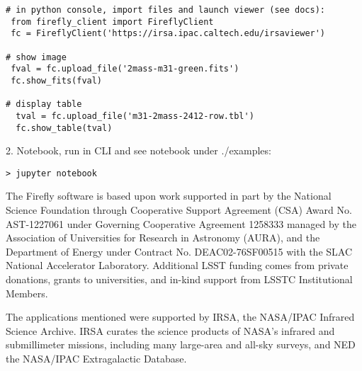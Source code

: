 \documentclass[11pt,twoside]{article}
\begin{document}
\begin{verbatim}
# in python console, import files and launch viewer (see docs):
 from firefly_client import FireflyClient
 fc = FireflyClient('https://irsa.ipac.caltech.edu/irsaviewer')

# show image
 fval = fc.upload_file('2mass-m31-green.fits')
 fc.show_fits(fval)

# display table
  tval = fc.upload_file('m31-2mass-2412-row.tbl')
  fc.show_table(tval)
\end{verbatim}

2. Notebook, run in CLI and see notebook under ./examples:
\begin{verbatim}
> jupyter notebook
\end{verbatim}

\acknowledgements

The Firefly software is based upon work supported in part by the National
Science Foundation through Cooperative Support Agreement (CSA) Award No. AST-1227061 under Governing
Cooperative Agreement 1258333 managed by the Association of Universities for Research in Astronomy (AURA), and
the Department of Energy under Contract No. DEAC02-76SF00515 with the SLAC National Accelerator Laboratory.
Additional LSST funding comes from private donations, grants to universities, and in-kind support from LSSTC
Institutional Members.

\smallskip
The applications mentioned were supported by IRSA, the NASA/IPAC Infrared Science Archive. IRSA curates the science
products of NASA's infrared and submillimeter missions, including many large-area and all-sky surveys, and NED the NASA/IPAC Extragalactic Database.

\end{document}
